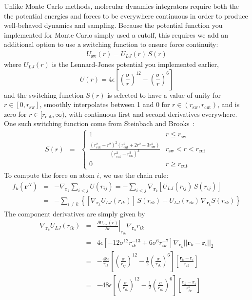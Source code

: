 \documentclass[aip,jcp,preprint,superscriptaddress,floatfix]{revtex4-1}
\begin{document}
Unlike Monte Carlo methods, molecular dynamics integrators require both the the potential energies and forces to be everywhere continuous in order to produce well-behaved dynamics and sampling.
Because the potential function you implemented for Monte Carlo simply used a cutoff, this requires we add an additional option to use a switching function to ensure force continuity:
\begin{eqnarray}
U_\mathrm{sw}(r) = U_{LJ}(r) \, S(r)
\end{eqnarray}
where $U_{LJ}(r)$ is the Lennard-Jones potential you implemented earlier, 
\begin{equation}
U(r) = 4 \epsilon \left[\left(\frac{\sigma}{r}\right)^{12} -\left(\frac{\sigma}{r}\right)^{6} \right] 
\end{equation}
and the switching function $S(r)$ is selected to have a value of unity for $r \in [0, r_\mathrm{sw}]$, smoothly interpolates between 1 and 0 for $r \in (r_\mathrm{sw}, r_\mathrm{cut})$, and is zero for $r \in [r_\mathrm{cut}, \infty)$, with continuous first and second derivatives everywhere.
One such switching function come from Steinbach and Brooks~\cite{SwitchingFunction,Shirts.JCP.119.5740.2003}:
\begin{eqnarray}
S(r) &=& \begin{cases}
1 & r \le r_\mathrm{sw} \\
\frac{(r_\mathrm{cut}^2 - r^2)^2 (r_\mathrm{cut}^2 + 2 r^2 - 3 r_\mathrm{sw}^2)}{(r_\mathrm{cut}^2 - r_\mathrm{sw}^2)^3} & r_\mathrm{sw} < r < r_\mathrm{cut} \\
0 & r \ge r_\mathrm{cut}
\end{cases}
\end{eqnarray}
To compute the force on atom $i$, we use the chain rule:
\begin{eqnarray}
f_k(\textbf{r}^N) &=& - \nabla_{\textbf{r}_k} \sum_{i < j} U(r_{ij}) =  - \sum_{i < j} \nabla_{\textbf{r}_k} \left[ U_{LJ}(r_{ij}) \, S(r_{ij}) \right] \nonumber \\
&=& - \sum_{i \ne k} \left\{ [ \nabla_{\textbf{r}_k} U_{LJ}(r_{ik}) ] \, S(r_{ik}) + U_{LJ}(r_{ik}) \,  \nabla_{\textbf{r}_k} S(r_{ik}) \right\}
\end{eqnarray}
The component derivatives are simply given by
\begin{eqnarray}
\nabla_{\mathbf{r}_k} U_{LJ}(r_{ik}) &=& \left. \frac{\partial U_{LJ}(r)}{\partial r} \right|_{r_{ik}} \nabla_{\mathbf{r}_k} r_{ik}  \\
&=& 4 \epsilon \left[- 12 \sigma^{12} r_{ik}^{-13} + 6 \sigma^6 r_{ik}^{-7} \right] \nabla_{\mathbf{r}_k} || \mathbf{r}_k - \mathbf{r}_i ||_2  \\
&=& - \frac{48 \epsilon}{r_{ik}} \left[\left(\frac{\sigma}{r_{ij}}\right)^{12} - \frac{1}{2} \left(\frac{\sigma}{r_{ik}}\right)^{6} \right] \left[ \frac{\mathbf{r}_k - \mathbf{r}_i}{r_{ik}} \right] \\
&=& - 48 \epsilon \left[\left(\frac{\sigma}{r_{ik}}\right)^{12} - \frac{1}{2} \left(\frac{\sigma}{r_{ik}}\right)^{6} \right] \left[ \frac{\mathbf{r}_k - \mathbf{r}_i}{r_{ik}^2} \right]
\end{eqnarray}
\end{document}
